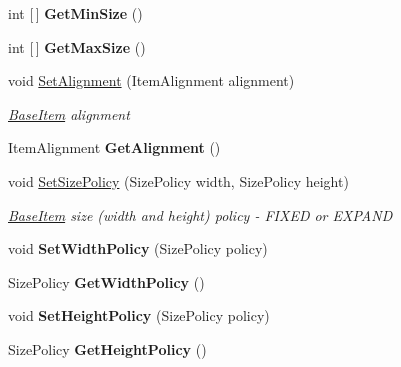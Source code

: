 \begin{DoxyCompactItemize}
int \mbox{[}$\,$\mbox{]} {\bfseries Get\+Min\+Size} ()
\item 
\mbox{\label{class_space_v_i_l_1_1_base_item_ac53fdc9c5d53b6d295d5fcd77ae26c2e}} 
int \mbox{[}$\,$\mbox{]} {\bfseries Get\+Max\+Size} ()
\item 
void \mbox{\hyperlink{class_space_v_i_l_1_1_base_item_a2e307fb7749ddd02e3cf7489849be9f0}{Set\+Alignment}} (Item\+Alignment alignment)
\begin{DoxyCompactList}\small\item\em \mbox{\hyperlink{class_space_v_i_l_1_1_base_item}{Base\+Item}} alignment \end{DoxyCompactList}\item 
\mbox{\label{class_space_v_i_l_1_1_base_item_a699c58e54f41d2c2c688cf336563ee48}} 
Item\+Alignment {\bfseries Get\+Alignment} ()
\item 
void \mbox{\hyperlink{class_space_v_i_l_1_1_base_item_ae07c14607caf666e80c40f9f0df2882a}{Set\+Size\+Policy}} (Size\+Policy width, Size\+Policy height)
\begin{DoxyCompactList}\small\item\em \mbox{\hyperlink{class_space_v_i_l_1_1_base_item}{Base\+Item}} size (width and height) policy -\/ F\+I\+X\+ED or E\+X\+P\+A\+ND \end{DoxyCompactList}\item 
\mbox{\label{class_space_v_i_l_1_1_base_item_a54c4128d60fd9f13d1239132841a74fc}} 
void {\bfseries Set\+Width\+Policy} (Size\+Policy policy)
\item 
\mbox{\label{class_space_v_i_l_1_1_base_item_acabce4137c0a1b99eb75022b4a58cc20}} 
Size\+Policy {\bfseries Get\+Width\+Policy} ()
\item 
\mbox{\label{class_space_v_i_l_1_1_base_item_a64a2ecc1459e4dc5721b5919592da1a5}} 
void {\bfseries Set\+Height\+Policy} (Size\+Policy policy)
\item 
\mbox{\label{class_space_v_i_l_1_1_base_item_a127b9adf116215833028bfc41f0e9967}} 
Size\+Policy {\bfseries Get\+Height\+Policy} ()
\item 

\end{DoxyCompactItemize}
